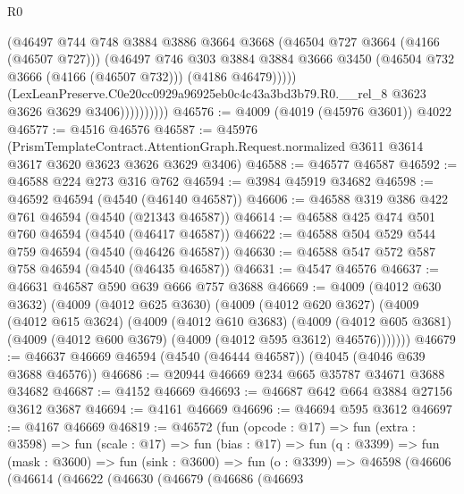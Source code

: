 \begin{lexlean}{R0}
\begin{coremodule}
                          (@46497
                            @744
                            @748
                            @3884
                            @3886
                            @3664
                            @3668
                            (@46504 @727 @3664 (@4166 (@46507 @727)))
                            (@46497
                              @746
                              @303
                              @3884
                              @3884
                              @3666
                              @3450
                              (@46504 @732 @3666 (@4166 (@46507 @732)))
                              (@4186 @46479)))))
                      (LexLeanPreserve.C0e20cc0929a96925eb0c4c43a3bd3b79.R0.__rel_8
                        @3623
                        @3626
                        @3629
                        @3406))))))))))
@46576 := @4009 (@4019 (@45976 @3601)) @4022
@46577 := @4516 @46576
@46587 := @45976
    (PrismTemplateContract.AttentionGraph.Request.normalized
      @3611
      @3614
      @3617
      @3620
      @3623
      @3626
      @3629
      @3406)
@46588 := @46577 @46587
@46592 := @46588 @224 @273 @316 @762
@46594 := @3984 @45919 @34682
@46598 := @46592 @46594 (@4540 (@46140 @46587))
@46606 := @46588 @319 @386 @422 @761 @46594 (@4540 (@21343 @46587))
@46614 := @46588 @425 @474 @501 @760 @46594 (@4540 (@46417 @46587))
@46622 := @46588 @504 @529 @544 @759 @46594 (@4540 (@46426 @46587))
@46630 := @46588 @547 @572 @587 @758 @46594 (@4540 (@46435 @46587))
@46631 := @4547 @46576
@46637 := @46631 @46587 @590 @639 @666 @757 @3688
@46669 := @4009
    (@4012 @630 @3632)
    (@4009
      (@4012 @625 @3630)
      (@4009
        (@4012 @620 @3627)
        (@4009
          (@4012 @615 @3624)
          (@4009
            (@4012 @610 @3683)
            (@4009
              (@4012 @605 @3681)
              (@4009 (@4012 @600 @3679) (@4009 (@4012 @595 @3612) @46576)))))))
@46679 := @46637 @46669 @46594 (@4540 (@46444 @46587)) (@4045 (@4046 @639 @3688 @46576))
@46686 := @20944 @46669 @234 @665 @35787 @34671 @3688 @34682
@46687 := @4152 @46669
@46693 := @46687 @642 @664 @3884 @27156 @3612 @3687
@46694 := @4161 @46669
@46696 := @46694 @595 @3612
@46697 := @4167 @46669
@46819 := @46572
    (fun (opcode : @17) =>
    fun (extra : @3598) =>
    fun (scale : @17) =>
    fun (bias : @17) =>
    fun (q : @3399) =>
    fun (mask : @3600) =>
    fun (sink : @3600) =>
    fun (o : @3399) =>
    @46598
      (@46606
        (@46614
          (@46622
            (@46630
              (@46679
                (@46686
                  (@46693

\end{coremodule}
\end{lexlean}

